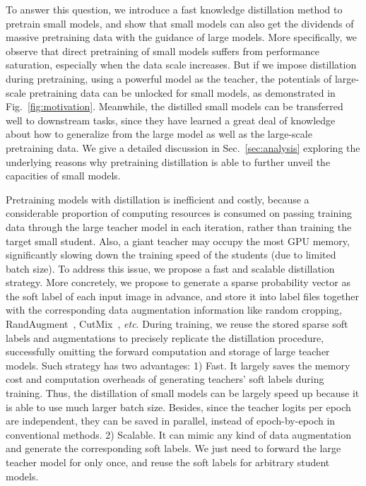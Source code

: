 \documentclass[runningheads]{llncs}
\newcommand\REV[1]{#1}
\begin{document}
To answer this question, we introduce a fast knowledge distillation method to pretrain small models, and show that small models can also get the dividends of massive pretraining data with the guidance of large models. 
More specifically, we observe that direct pretraining of small models suffers from performance saturation, especially when the data scale increases.
But if we impose distillation during pretraining, using a powerful model as the teacher, the potentials of large-scale pretraining data can be unlocked for small models, as demonstrated in Fig.~\ref{fig:motivation}.
Meanwhile, the distilled small models can be transferred well to downstream tasks, since they have learned a great deal of knowledge about how to generalize from the large model as well as the large-scale pretraining data. We give a detailed discussion in Sec.~\ref{sec:analysis} exploring the underlying reasons why pretraining distillation is able to further unveil the capacities of small models. 

Pretraining models with distillation is inefficient and costly, because a considerable proportion of computing resources is consumed on passing training data through the large teacher model in each iteration, rather than training the target small student. Also, a giant teacher may occupy the most GPU memory, significantly slowing down the training speed of the students (due to limited batch size). To address this issue, we propose a fast and scalable distillation strategy. More concretely, we propose to generate a sparse probability vector as the soft label of each input image in advance, and store it into label files together with the corresponding data augmentation information like random cropping, RandAugment~\cite{randaug}, CutMix~\cite{cutmix}, \emph{etc}. During training, we reuse the stored sparse soft labels and augmentations to precisely replicate the distillation procedure, successfully omitting the forward computation and storage of large teacher models. Such strategy has two advantages: 1) Fast. It largely saves the memory cost and computation overheads of generating teachers' soft labels during training. Thus, the distillation of small models can be largely speed up because it is able to use much larger batch size.
\REV{Besides, since the teacher logits per epoch are independent, they can be saved in parallel, instead of epoch-by-epoch in conventional methods.} 2) Scalable. It can mimic any kind of data augmentation and generate the corresponding soft labels. We just need to forward the large teacher model for only once, and reuse the soft labels for arbitrary student models.
\end{document}
